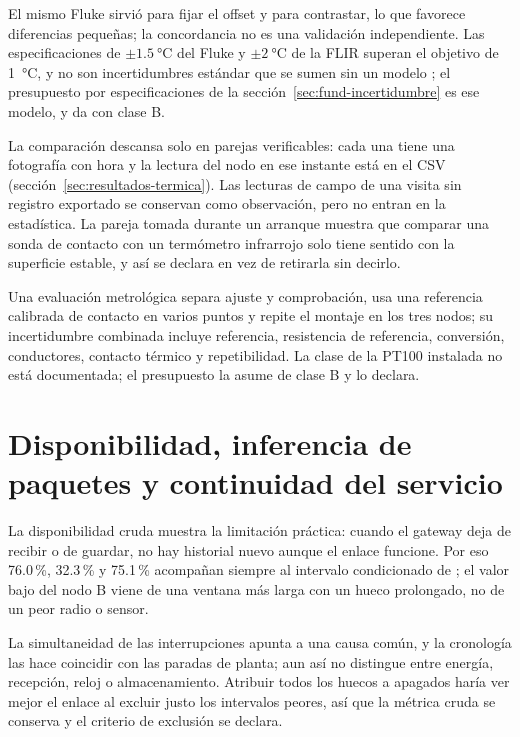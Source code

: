 El mismo Fluke sirvió para fijar el offset y para contrastar, lo que favorece diferencias pequeñas; la concordancia no es una validación independiente. Las especificaciones de $\pm\SI{1.5}{\celsius}$ del Fluke y $\pm\SI{2}{\celsius}$ de la FLIR superan el objetivo de \SI{1}{\celsius}, y no son incertidumbres estándar que se sumen sin un modelo \citep{jcgm2008,jcgm2012}; el presupuesto por especificaciones de la sección~\ref{sec:fund-incertidumbre} es ese modelo, y da \IncertidumbreTipoB{} con clase B.

La comparación descansa solo en parejas verificables: cada una tiene una fotografía con hora y la lectura del nodo en ese instante está en el CSV (sección~\ref{sec:resultados-termica}). Las lecturas de campo de una visita sin registro exportado se conservan como observación, pero no entran en la estadística. La pareja tomada durante un arranque muestra que comparar una sonda de contacto con un termómetro infrarrojo solo tiene sentido con la superficie estable, y así se declara en vez de retirarla sin decirlo.

Una evaluación metrológica separa ajuste y comprobación, usa una referencia calibrada de contacto en varios puntos y repite el montaje en los tres nodos; su incertidumbre combinada incluye referencia, resistencia de referencia, conversión, conductores, contacto térmico y repetibilidad. La clase de la PT100 instalada no está documentada; el presupuesto la asume de clase B y lo declara.

\section{Disponibilidad, inferencia de paquetes y continuidad del servicio}
La disponibilidad cruda muestra la limitación práctica: cuando el gateway deja de recibir o de guardar, no hay historial nuevo aunque el enlace funcione. Por eso 76.0\,\%, 32.3\,\% y 75.1\,\% acompañan siempre al intervalo condicionado de \DisponibilidadEnlace{}; el valor bajo del nodo B viene de una ventana más larga con un hueco prolongado, no de un peor radio o sensor.

La simultaneidad de las interrupciones apunta a una causa común, y la cronología las hace coincidir con las paradas de planta; aun así no distingue entre energía, recepción, reloj o almacenamiento. Atribuir todos los huecos a apagados haría ver mejor el enlace al excluir justo los intervalos peores, así que la métrica cruda se conserva y el criterio de exclusión se declara.

